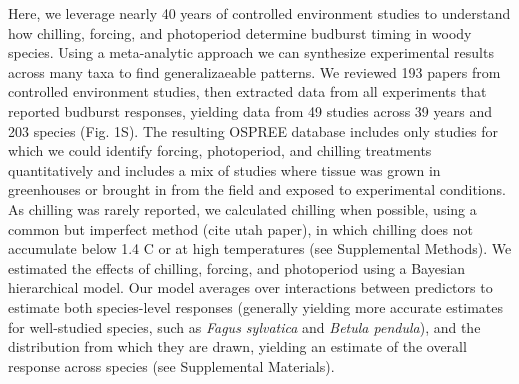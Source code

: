 \documentclass{article}
\begin{document}

\par Here, we leverage nearly 40 years of controlled environment studies to understand how chilling, forcing, and photoperiod determine budburst timing in woody species. Using a meta-analytic approach we can synthesize experimental results across many taxa to find generalizaeable patterns. We reviewed 193 papers from controlled environment studies, then extracted data from all experiments that reported budburst responses, yielding data from 49 studies across 39 years and 203 species (Fig. 1S). The resulting OSPREE database includes only studies for which we could identify forcing, photoperiod, and chilling treatments quantitatively and includes a mix of studies where tissue was grown in greenhouses or brought in from the field and exposed to experimental conditions. As chilling was rarely reported, we calculated chilling when possible, using a common but imperfect method (cite utah paper), in which chilling does not accumulate below 1.4 \degree C or at high temperatures (see Supplemental Methods). We estimated the effects of chilling, forcing, and photoperiod using a Bayesian hierarchical model. Our model averages over interactions between predictors to estimate both species-level responses (generally yielding more accurate estimates for well-studied species, such as \emph{Fagus sylvatica} and \emph{Betula pendula}), and the distribution from which they are drawn, yielding an estimate of the overall response across species (see Supplemental Materials).
\end{document}
